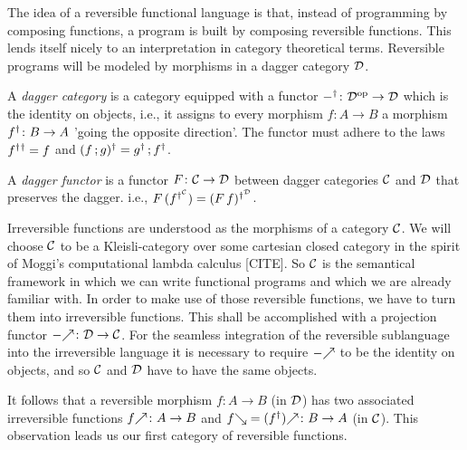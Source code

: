 \documentclass[runningheads,envcountsame]{llncs}
\begin{document}
    The idea of a reversible functional language is that, instead of programming by composing functions, a program is built by composing reversible functions. This lends itself nicely to an interpretation in category theoretical terms. Reversible programs will be modeled by morphisms in a dagger category $\mathcal{D}$.
    
    \begin{definition}
        A \emph{dagger category} is a category equipped with a functor $\rev{-}\colon \op{\D} \to \D$ which is the identity on objects, i.e., it assigns to every morphism $f\colon A \to B$ a morphism $\rev{f}\colon B \to A$ 'going the opposite direction'. The functor must adhere to the laws $\rev{f}\rev{{}} = f$ and $\rev{(\comp{f}{g})} = \comp{\rev{g}}{\rev{f}}$.
        
        A \emph{dagger functor} is a functor $F\colon \mathcal{C} \to \mathcal{D}$ between dagger categories $\mathcal{C}$ and $\mathcal{D}$ that preserves the dagger. i.e., $F\,(\rev[\C]{f}) = \rev[\D]{(F\,f)}$.
    \end{definition}
    
    Irreversible functions are understood as the morphisms of a category $\mathcal{C}$. We will choose $\mathcal{C}$ to be a Kleisli-category over some cartesian closed category in the spirit of Moggi's computational lambda calculus [CITE]. So $\mathcal{C}$ is the semantical framework in which we can write functional programs and which we are already familiar with. In order to make use of those reversible functions, we have to turn them into irreversible functions. This shall be accomplished with a projection functor $\f{-}\colon \D \to \C$. For the seamless integration of the reversible sublanguage into the irreversible language it is necessary to require $\f{-}$ to be the identity on objects, and so $\mathcal{C}$ and $\mathcal{D}$ have to have the same objects.
    
    It follows that a reversible morphism $f\colon A \to B$ (in $\mathcal{D}$) has two associated irreversible functions $\f{f}\colon A \to B$ and $\b{f} = \f{(\rev{f})}\colon B \to A$ (in $\mathcal{C}$). This observation leads us our first category of reversible functions.
    
\end{document}
